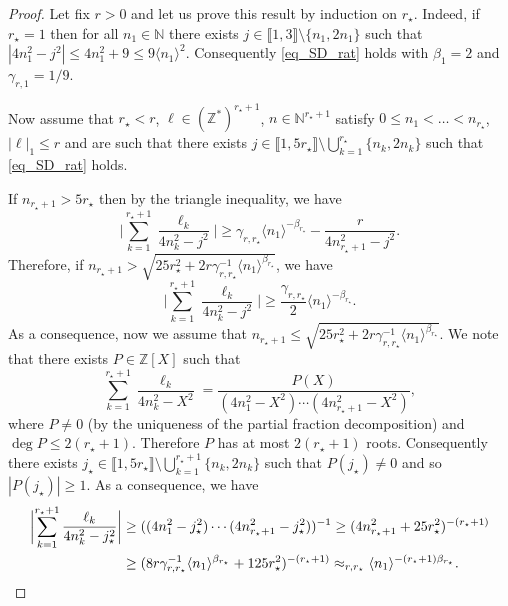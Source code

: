 \begin{proof} Let fix $r>0$ and let us prove this result by induction on $r_\star$. Indeed, if~$r_\star = 1$ then for all $n_1\in \mathbb{N}$ there exists $j\in \llbracket 1,3 \rrbracket \setminus \{n_1,2n_1\}$ such that $|4n_1^2-j^2 |\leq 4 n_1^2 + 9 \leq 9 \langle n_1 \rangle^2$. Consequently \eqref{eq_SD_rat} holds with $\beta_1=2$ and $\gamma_{r,1} = 1/9$.

Now assume that $r_\star < r$, $\ell \in (\mathbb{Z}^*)^{r_\star+1}$, $n \in \mathbb{N}^{r_\star+1}$ satisfy $0\leq n_1 < \dots < n_{r_\star}$, $|\ell|_1\leq r$ and are such that there exists $j\in \llbracket 1,5r_\star \rrbracket \setminus \bigcup_{k=1}^{r_\star}\{ n_k,2n_k\}$ such that \eqref{eq_SD_rat} holds.

If $n_{r_\star+1}> 5 r_\star$ then by the triangle inequality, we have
\[
\biggl| \sum_{k=1}^{r_\star+1} \frac{\ell_k}{4n_k^2-j^2} \biggr| \geq \gamma_{r,r_\star} \langle n_1 \rangle^{-\beta_{r_\star}} - \frac{r}{4n_{r_\star+1}^2-j^2}.
\]
Therefore, if $n_{r_\star+1} > \sqrt{25r_\star^2 +2r \gamma_{r,r_\star}^{-1} \langle n_1 \rangle^{\beta_{r_\star}} }$, we have
\[
\biggl| \sum_{k=1}^{r_\star+1} \frac{\ell_k}{4n_k^2-j^2} \biggr| \geq \frac{\gamma_{r,r_\star}}2 \langle n_1 \rangle^{-\beta_{r_\star}}.
\]
As a consequence, now we assume that $n_{r_\star+1} \leq \sqrt{25r_\star^2 +2r \gamma_{r,r_\star}^{-1} \langle n_1 \rangle^{\beta_{r_\star}} }$. We note that there exists $P\in \mathbb{Z}[X]$ such that
\[
\sum_{k=1}^{r_\star+1} \frac{\ell_k}{4n_k^2-X^2} = \frac{P(X)}{(4n_1^2-X^2) \cdots (4n_{r_\star+1}^2-X^2) },
\]
where $P\neq 0$ (by the uniqueness of the partial fraction decomposition) and $\deg P \leq 2 (r_\star +1)$. Therefore $P$ has at most $2 (r_\star +1)$ roots. Consequently there exists $j_\star\in \llbracket 1,5r_\star \rrbracket \setminus \bigcup_{k=1}^{r_\star+1}\{ n_k,2n_k\}$ such that $P(j_\star) \neq 0$ and so $|P(j_\star)|\geq 1$. As a consequence, we have
\begin{align*}
\biggl| \sum_{k=1}^{r_\star+1} \frac{\ell_k}{4n_k^2-j_\star^2} \biggr| &\geq ((4n_1^2-j_\star^2) \cdots (4n_{r_\star+1}^2-j_\star^2))^{-1} \geq (4n_{r_\star+1}^2+25r_\star^2)^{-(r_\star+1)} \\
&\geq (8r \gamma_{r,r_\star}^{-1} \langle n_1 \rangle^{\beta_{r_\star}}+125r_\star^2)^{-(r_\star+1)} \approx_{r,r_\star} \langle n_1 \rangle^{ -(r_\star+1) \beta_{r_\star}}.\qedhere
\end{align*}
\end{proof}

